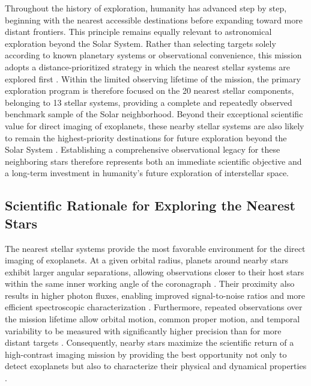 Throughout the history of exploration, humanity has advanced step by step, beginning
with the nearest accessible destinations before expanding toward more distant frontiers. This principle remains equally relevant to astronomical exploration beyond the Solar System. Rather than selecting targets solely according to known planetary systems or observational convenience, this mission adopts a distance-prioritized strategy in which the nearest stellar systems are explored first \cite{Henry2018,Gaia2022}. 
Within the limited observing lifetime of the mission, the primary exploration program is therefore focused on the 20 nearest stellar components, belonging to 13 stellar systems, providing a complete and repeatedly observed benchmark sample of the Solar neighborhood. Beyond their exceptional scientific value for direct imaging of exoplanets, these nearby stellar systems are also likely to remain the highest-priority destinations for future exploration beyond the Solar System \cite{Lubin2016}. Establishing a
comprehensive observational legacy for these neighboring stars therefore represents
both an immediate scientific objective and a long-term investment in humanity's future
exploration of interstellar space.

\subsection{Scientific Rationale for Exploring the Nearest Stars}
\label{sec:Rationale_Nearest}

The nearest stellar systems provide the most favorable environment for the direct 
imaging of exoplanets. At a given orbital radius, planets around nearby stars exhibit larger angular separations, allowing observations closer to their host stars within the same inner working angle of the coronagraph \cite{Traub2010}. 
Their proximity also results in higher photon fluxes, enabling improved signal-to-noise ratios and more efficient spectroscopic characterization \cite{LUVOIR2019}. 
Furthermore, repeated observations over the mission lifetime allow orbital motion, common proper motion, and temporal variability to be measured with significantly higher precision than for more distant targets \cite{Macintosh2015}. Consequently, nearby stars maximize the scientific return of a
high-contrast imaging mission by providing the best opportunity not only to detect
exoplanets but also to characterize their physical and dynamical properties
\cite{LUVOIR2019}.

